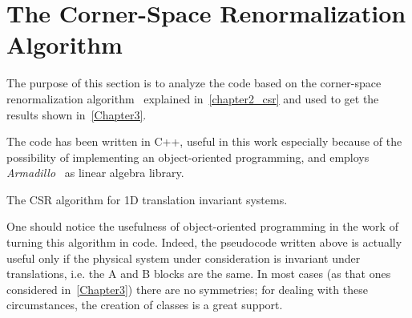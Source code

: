 \chapter{The Corner-Space Renormalization Algorithm} %
\label{AppendixA}

The purpose of this section is to analyze the code based on the corner-space renormalization algorithm~\cite{PhysRevLett.115.080604} explained in~\ref{chapter2_csr} and used to get the results shown in~\ref{Chapter3}.

The code has been written in C++, useful in this work especially because of the possibility of implementing an object-oriented programming, and employs \emph{Armadillo}~\cite{arma:book, arma:art} as linear algebra library. 

\begin{algorithm}[H]
\label{algo_trans_inv}
\SetAlgoLined
\DontPrintSemicolon
{}
\bigskip
{}

\caption{The CSR algorithm for 1D translation invariant systems.}
\label{pseudocode}
\end{algorithm}

One should notice the usefulness of object-oriented programming in the work of turning this algorithm in code. Indeed, the pseudocode written above is actually useful only if the physical system under consideration is invariant under translations, i.e. the A and B blocks are the same. In most cases (as that ones considered in~\ref{Chapter3}) there are no symmetries; for dealing with these circumstances, the creation of classes is a great support.

